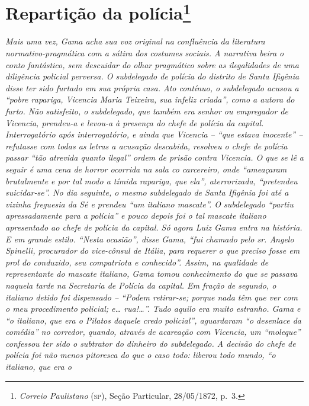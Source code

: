 \chapter{Repartição da polícia\footnote{\emph{Correio Paulistano} (\textsc{sp}), Seção Particular,
  28/05/1872, p.~3.}} %

\begin{didascalia}
\emph{Mais uma vez, Gama acha sua voz original na confluência da
literatura normativo-pragmática com a sátira dos costumes sociais. A
narrativa beira o conto fantástico, sem descuidar do olhar pragmático
sobre as ilegalidades de uma diligência policial perversa. O subdelegado
de polícia do distrito de Santa Ifigênia disse ter sido furtado em sua
própria casa. Ato contínuo, o subdelegado acusou a ``pobre rapariga,
Vicencia Maria Teixeira, sua infeliz criada'', como a autora do furto.
Não satisfeito, o subdelegado, que também era senhor ou empregador de
Vicencia, prendeu-a e levou-a à presença do chefe de polícia da capital.
Interrogatório após interrogatório, e ainda que Vicencia -- ``que estava
inocente'' -- refutasse com todas as letras a acusação descabida,
resolveu o chefe de polícia passar ``tão atrevida quanto ilegal'' ordem de
prisão contra Vicencia. O que se lê a seguir é uma cena de horror
ocorrida na sala co carcereiro, onde ``ameaçaram brutalmente e por tal
modo a tímida rapariga, que ela'', aterrorizada, ``pretendeu suicidar-se''.
No dia seguinte, o mesmo subdelegado de Santa Ifigênia foi até a vizinha
freguesia da Sé e prendeu ``um italiano mascate''. O subdelegado ``partiu
apressadamente para a polícia'' e pouco depois foi o tal mascate italiano
apresentado ao chefe de polícia da capital. Só agora Luiz Gama entra na
história. E em grande estilo. ``Nesta ocasião'', disse Gama, ``fui chamado
pelo sr. Angelo Spinelli, procurador do vice-cônsul de Itália, para
requerer o que preciso fosse em prol do conduzido, seu compatriota e
conhecido''. Assim, na qualidade de representante do mascate italiano,
Gama tomou conhecimento do que se passava naquela tarde na Secretaria de
Polícia da capital. Em fração de segundo, o italiano detido foi
dispensado -- ``Podem retirar-se; porque nada têm que ver com o meu
procedimento policial; e\ldots{} rua!\ldots{}''. Tudo aquilo era muito estranho.
Gama e ``o italiano, que era o Pilatos daquele credo policial'',
aguardaram ``o desenlace da comédia'' no corredor, quando, através de
acareação com Vicencia, um ``moleque'' confessou ter sido o subtrator do
dinheiro do subdelegado. A decisão do chefe de polícia foi não menos
pitoresca do que o caso todo: liberou todo mundo, ``o italiano, que era o
}
\end{didascalia}
